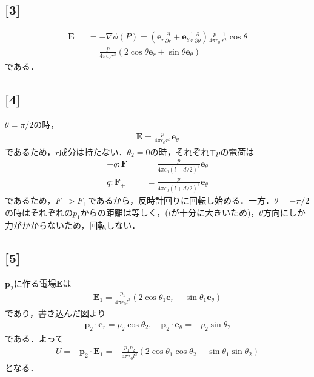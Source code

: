 \documentclass[12pt,dvipdfmx]{jsarticle}
\begin{document}
\subsection*{\large{[3]}}
\begin{eqnarray}
  \bm{E} &&= -\nabla\phi(P) = \left( \bm{e}_r\frac{\partial}{\partial r} + \bm{e}_{\theta}\frac{1}{r}\frac{\partial}{\partial\theta} \right)\frac{p}{4\pi\epsilon_0}\frac{1}{r^2}\cos\theta\\
  &&= \frac{p}{4\pi\epsilon_0r^3}\left( 2\cos\theta\bm{e}_r + \sin\theta\bm{e}_\theta \right)
\end{eqnarray}
である．
\subsection*{\large{[4]}}
$\theta=\pi/2$の時，
\begin{eqnarray}
  \bm{E} = \frac{p}{4\pi\epsilon_0 r^3}\bm{e}_\theta
\end{eqnarray}
であるため，$r$成分は持たない．$\theta_2 = 0$の時，それぞれ$\mp p$の電荷は
\begin{eqnarray}
  -q : \bm{F}_- &&= \frac{p}{4\pi\epsilon_0 (l-d/2)^3}\bm{e}_\theta\\
  q : \bm{F}_+ &&= \frac{p}{4\pi\epsilon_0 (l+d/2)^3}\bm{e}_\theta
\end{eqnarray}
であるため，$F_->F_+$であるから，反時計回りに回転し始める．一方．$\theta=-\pi/2$の時はそれぞれの$p_1$からの距離は等しく，($l$が十分に大きいため)，$\theta$方向にしか力がかからないため，回転しない．
\subsection*{\large{[5]}}
$\bm{p}_2$に作る電場$\bm{E}$は
\begin{eqnarray}
  \bm{E}_1 = \frac{p_1}{4\pi\epsilon_0l^3} \left( 2\cos\theta_1\bm{e}_r + \sin\theta_1\bm{e}_\theta \right)
\end{eqnarray}
であり，書き込んだ図より
\begin{eqnarray}
  \bm{p}_2\cdot\bm{e}_r =p_2 \cos\theta_2, \quad \bm{p}_2\cdot\bm{e}_\theta = -p_2\sin\theta_2
\end{eqnarray}
である．よって
\begin{eqnarray}
  U = -\bm{p}_2\cdot\bm{E}_1 = -\frac{p_1p_2}{4\pi\epsilon_0l^3} \left( 2\cos\theta_1\cos\theta_2- \sin\theta_1\sin\theta_2\right)
\end{eqnarray}
となる．
\end{document}
